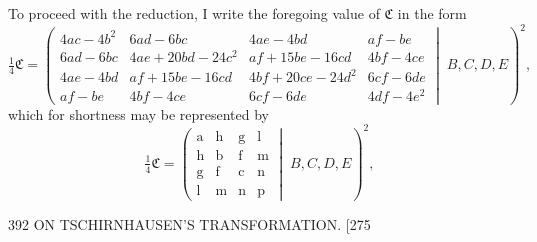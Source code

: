 \documentclass[11pt]{article}
\begin{document}
To proceed with the reduction, I write the foregoing value of $\mathfrak{C}$ in the form
\[ \tfrac{1}{4}\mathfrak{C}=\left(
\begin{array}{cccc}
4ac-4b^{2} & 6ad-6bc & 4ae-4bd & af-be \\
6ad-6bc & 4ae+20bd-24c^{2} & af+15be-16cd & 4bf-4ce \\
4ae-4bd & af+15be-16cd & 4bf+20ce-24d^{2} & 6cf-6de \\
af-be & 4bf-4ce & 6cf-6de & 4df-4e^{2}
\end{array}
\!\middle|\; B,C,D,E\right)^{2}, \]
which for shortness may be represented by
\[ \tfrac{1}{4}\mathfrak{C}=\left(
\begin{array}{cccc}
\mathrm{a} & \mathrm{h} & \mathrm{g} & \mathrm{l}\\
\mathrm{h} & \mathrm{b} & \mathrm{f} & \mathrm{m}\\
\mathrm{g} & \mathrm{f} & \mathrm{c} & \mathrm{n}\\
\mathrm{l} & \mathrm{m} & \mathrm{n} & \mathrm{p}
\end{array}\!\middle|\;B,C,D,E\right)^{2}, \]

\begin{center}
392 \hfill ON TSCHIRNHAUSEN'S TRANSFORMATION. \hfill \textsc{[275}
\end{center}
\end{document}

